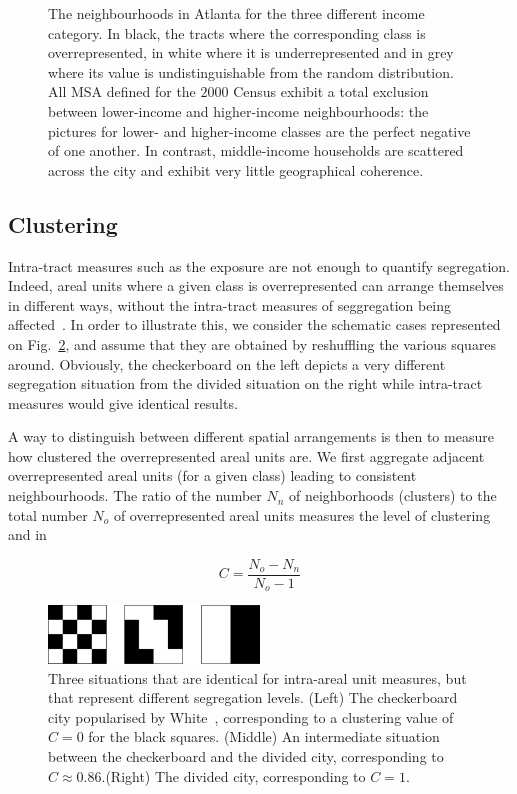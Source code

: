 \begin{figure}[!h]
    \caption{The neighbourhoods in Atlanta for the three different
      income category. In black, the tracts where the corresponding
      class is overrepresented, in white where it is
      underrepresented and in grey where its value is
      undistinguishable from the random distribution. All
      MSA defined for the $2000$ Census exhibit a total exclusion between
      lower-income and higher-income
      neighbourhoods: the pictures for lower- and higher-income classes are the
      perfect negative of one another. In contrast, middle-income households
      are scattered across the city and exhibit very little geographical coherence.}
\label{fig:atlanta_neighbourhoods}
\end{figure}



\subsection{Clustering}
\label{sub:clustering}

Intra-tract measures such as the exposure are not enough to quantify
segregation. Indeed, areal units where a given class is overrepresented can
arrange themselves in different ways, without the intra-tract measures of
seggregation being affected~\cite{White:1983}. In order to illustrate this, we
consider the schematic cases represented on Fig.~\ref{fig:checkerboard}, and
assume that  they are obtained by reshuffling the various squares around.
Obviously, the checkerboard on the left depicts a very different segregation
situation from the divided situation on the right while intra-tract measures
would give identical results.


A way to distinguish between different spatial arrangements is then to measure
how clustered the overrepresented areal units are. We first aggregate adjacent
overrepresented areal units (for a given class) leading to consistent
neighbourhoods. The ratio of the number $N_n$ of neighborhoods (clusters) to the
total number $N_o$ of overrepresented areal units measures the level of
clustering and in 

\begin{equation} 
    C = \frac{N_{o}-N_{n}}{N_{o}-1} 
\end{equation}

\begin{figure}[!h]
    \centering
    \includegraphics[width=0.5\textwidth]{./gfx/chapter-segregation/figure5.pdf}
    \caption{Three situations that are identical for intra-areal unit measures,
        but that represent different segregation levels. (Left) The checkerboard
        city popularised by White~\cite{White:1983}, corresponding to a
        clustering value of $C=0$ for the black squares. (Middle) An
        intermediate situation between the checkerboard and the divided city,
        corresponding to $C \approx 0.86$.(Right) The divided city, corresponding to
        $C=1$. \label{fig:checkerboard}} 
\end{figure}

